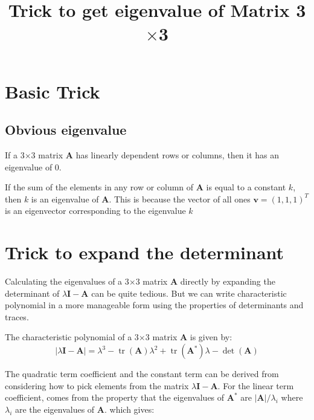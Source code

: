 \documentclass{article}
\begin{document}
\newcommand{\tr}{\operatorname{tr}}
\newcommand{\rank}{\operatorname{rank}}
\newcommand{\diag}{\operatorname{diag}}

\title{Trick to get eigenvalue of Matrix 3$\times$3}
\author{}
\maketitle

\section{Basic Trick}

\subsection{Obvious eigenvalue}

If a 3$\times$3 matrix \( \boldsymbol A \) has linearly dependent rows or columns,
then it has an eigenvalue of 0.

If the sum of the elements in any row or column of \( \boldsymbol A \) is
equal to a constant \( k \), then \( k \) is an eigenvalue of \( \boldsymbol A \).
This is because the vector of all ones \( \boldsymbol v = (1, 1, 1)^T \)
is an eigenvector corresponding to the eigenvalue \( k \)


\section{Trick to expand the determinant}

Calculating the eigenvalues of a 3$\times$3 matrix \( \boldsymbol A \) directly by
expanding the determinant of \( \lambda \boldsymbol I - \boldsymbol A \) can 
be quite tedious. But we can write characteristic polynomial in a more manageable
form using the properties of determinants and traces.

The characteristic polynomial of a 3$\times$3 matrix \( \boldsymbol A \) is given by:
\[
	|\lambda \boldsymbol I - \boldsymbol A| = 
	\lambda^3 - \tr(\boldsymbol A) \lambda^2 + \tr(\boldsymbol{A}^{*}) \lambda - \det(\boldsymbol A)
\]

The quadratic term coefficient and the constant term can be derived from considering
how to pick elements from the matrix $\lambda\boldsymbol{I}-\boldsymbol{A}$. For
the linear term coefficient, comes from the property that the eigenvalues of $\boldsymbol{A}^{*}$ 
are $|\boldsymbol{A}|/\lambda_i$ where $\lambda_i$ are the eigenvalues of $\boldsymbol{A}$.
which gives:
\end{document}
